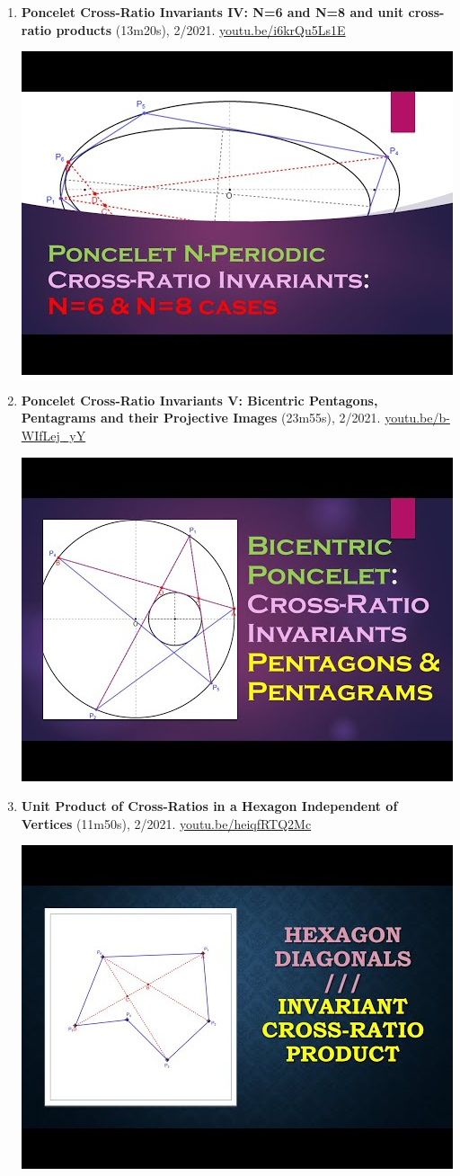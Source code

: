 \documentclass[12pt]{article}
\begin{document}
\begin{enumerate}[resume]
% 
\item \textbf{Poncelet Cross-Ratio Invariants IV: N=6 and N=8 and unit cross-ratio products} (13m20s), 2/2021. \href{https://youtu.be/i6krQu5Ls1E}{\url{youtu.be/i6krQu5Ls1E}}
\begin{center}\includegraphics[width=.5\textwidth]{pics/i6krQu5Ls1E.jpg}\end{center}
% 
\item \textbf{Poncelet Cross-Ratio Invariants V: Bicentric Pentagons, Pentagrams and their Projective Images} (23m55s), 2/2021. \href{https://youtu.be/b-WIfLej_yY}{\url{youtu.be/b-WIfLej\_yY}}
\begin{center}\includegraphics[width=.5\textwidth]{pics/b-WIfLej_yY.jpg}\end{center}
% 
\item \textbf{Unit Product of Cross-Ratios in a Hexagon Independent of Vertices} (11m50s), 2/2021. \href{https://youtu.be/heiqfRTQ2Mc}{\url{youtu.be/heiqfRTQ2Mc}}
\begin{center}\includegraphics[width=.5\textwidth]{pics/heiqfRTQ2Mc.jpg}\end{center}
% 
\end{enumerate}
\end{document}
